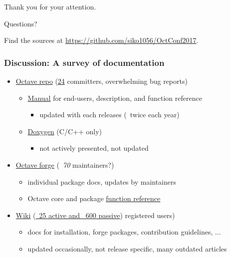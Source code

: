 \documentclass[xcolor=svgnames]{beamer}
\begin{document}
\begin{frame}
\begin{center}
\Huge
Thank you for your attention.

Questions?

\vfill

\normalsize
Find the sources at \url{https://github.com/siko1056/OctConf2017}.
\end{center}
\end{frame}



\begin{frame}[noframenumbering]
\frametitle{Discussion: A survey of documentation}

\begin{itemize}
\item \href{http://hg.savannah.gnu.org/hgweb/octave/file/tip/doc}{Octave repo}
  (\href{https://savannah.gnu.org/project/memberlist.php?group=octave}{24}
  committers, overwhelming bug reports)
  \begin{itemize}
  \item \href{https://www.gnu.org/software/octave/doc/interpreter/}{Manual}
    for end-users, description, and function reference
    \begin{itemize}
    \item updated with each releases (~twice each year)
    \end{itemize}
  \item \href{http://wiki.octave.org/Doxygen}{Doxygen} (C/C++ only)
    \begin{itemize}
    \item not actively presented, not updated
    \end{itemize}
  \end{itemize}
\item \href{https://octave.sourceforge.io}{Octave forge}
  (\textit{~70} maintainers?)
  \begin{itemize}
  \item individual package docs, updates by maintainers
  \item Octave core and package
  \href{https://octave.sourceforge.io/octave/overview.html}{function reference}
  \end{itemize}
\item \href{http://wiki.octave.or}{Wiki}
  (\href{http://wiki.octave.org/Special:Statistics}{~25 active and ~600 passive})
  registered users)
  \begin{itemize}
  \item docs for installation, forge packages, contribution guidelines, ...
  \item updated occasionally, not release specific, many outdated articles
  \end{itemize}
\end{itemize}
\end{frame}
\end{document}
